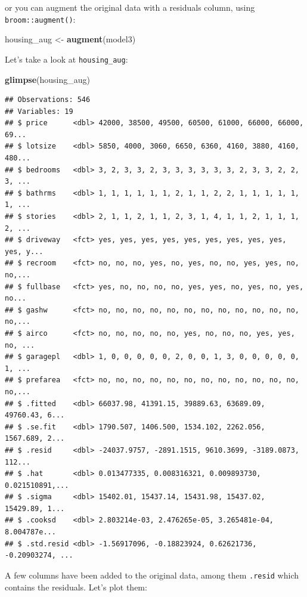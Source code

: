 \documentclass[]{gitbook}
\newenvironment{Shaded}{\begin{snugshade}}{\end{snugshade}}
\newcommand{\KeywordTok}[1]{\textcolor[rgb]{0.13,0.29,0.53}{\textbf{#1}}}
\newcommand{\NormalTok}[1]{#1}
\newcommand{\StringTok}[1]{\textcolor[rgb]{0.31,0.60,0.02}{#1}}
\begin{document}
or you can augment the original data with a residuals column, using \texttt{broom::augment()}:

\begin{Shaded}
\begin{Highlighting}[]
\NormalTok{housing_aug <-}\StringTok{ }\KeywordTok{augment}\NormalTok{(model3)}
\end{Highlighting}
\end{Shaded}

Let's take a look at \texttt{housing\_aug}:

\begin{Shaded}
\begin{Highlighting}[]
\KeywordTok{glimpse}\NormalTok{(housing_aug)}
\end{Highlighting}
\end{Shaded}

\begin{verbatim}
## Observations: 546
## Variables: 19
## $ price      <dbl> 42000, 38500, 49500, 60500, 61000, 66000, 66000, 69...
## $ lotsize    <dbl> 5850, 4000, 3060, 6650, 6360, 4160, 3880, 4160, 480...
## $ bedrooms   <dbl> 3, 2, 3, 3, 2, 3, 3, 3, 3, 3, 3, 2, 3, 3, 2, 2, 3, ...
## $ bathrms    <dbl> 1, 1, 1, 1, 1, 1, 2, 1, 1, 2, 2, 1, 1, 1, 1, 1, 1, ...
## $ stories    <dbl> 2, 1, 1, 2, 1, 1, 2, 3, 1, 4, 1, 1, 2, 1, 1, 1, 2, ...
## $ driveway   <fct> yes, yes, yes, yes, yes, yes, yes, yes, yes, yes, y...
## $ recroom    <fct> no, no, no, yes, no, yes, no, no, yes, yes, no, no,...
## $ fullbase   <fct> yes, no, no, no, no, yes, yes, no, yes, no, yes, no...
## $ gashw      <fct> no, no, no, no, no, no, no, no, no, no, no, no, no,...
## $ airco      <fct> no, no, no, no, no, yes, no, no, no, yes, yes, no, ...
## $ garagepl   <dbl> 1, 0, 0, 0, 0, 0, 2, 0, 0, 1, 3, 0, 0, 0, 0, 0, 1, ...
## $ prefarea   <fct> no, no, no, no, no, no, no, no, no, no, no, no, no,...
## $ .fitted    <dbl> 66037.98, 41391.15, 39889.63, 63689.09, 49760.43, 6...
## $ .se.fit    <dbl> 1790.507, 1406.500, 1534.102, 2262.056, 1567.689, 2...
## $ .resid     <dbl> -24037.9757, -2891.1515, 9610.3699, -3189.0873, 112...
## $ .hat       <dbl> 0.013477335, 0.008316321, 0.009893730, 0.021510891,...
## $ .sigma     <dbl> 15402.01, 15437.14, 15431.98, 15437.02, 15429.89, 1...
## $ .cooksd    <dbl> 2.803214e-03, 2.476265e-05, 3.265481e-04, 8.004787e...
## $ .std.resid <dbl> -1.56917096, -0.18823924, 0.62621736, -0.20903274, ...
\end{verbatim}

A few columns have been added to the original data, among them \texttt{.resid} which contains the
residuals. Let's plot them:
\end{document}

